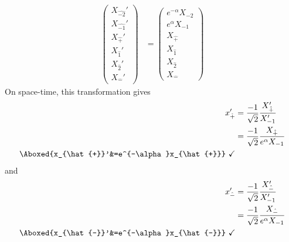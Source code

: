 \documentclass[]{article}
\numberwithin{equation}{section}
\begin{document}
{{\begin{align}
    \begin{pmatrix}
    {X}_{\hat{-2}}'\\
    {X}_{\hat{-1}}'\\
    {X}_{\hat{+}}'\\
    {X}_{\hat{1}}'\\
    {X}_{\hat{2}}'\\
    {X}_{\hat{-}}'
    \end{pmatrix}&= \begin{pmatrix}
    e^{-\alpha}{X}_{-2}\\
    e^{\alpha}{X}_{-1}\\
    {X}_{\hat{+}}\\
    {X}_{\hat{1}}\\
    {X}_{\hat{2}}\\
    {X}_{\hat{-}}
    \end{pmatrix}
\end{align}
On space-time, this transformation gives
\begin{align}
    x_{\hat{+}}'&=\frac{-1}{\sqrt{2}}\frac{{X}_{{\hat{+}}}'}{ {X}_{-1}'}\\
    &=\frac{-1}{\sqrt{2}}\frac{{X}_{{\hat{+}}}}{ e^{\alpha}{X}_{-1}}\\
    \Aboxed{x_{\hat{+}}'&=e^{-\alpha}x_{\hat{+}}}~\checkmark
\end{align}
and
\begin{align}
    x_{\hat{-}}'&=\frac{-1}{\sqrt{2}}\frac{{X}_{\hat{-}}'}{ {X}_{-1}'}\\
    &=\frac{-1}{\sqrt{2}}\frac{{X}_{\hat{-}}}{ e^{\alpha}{X}_{-1}}\\
    \Aboxed{x_{\hat{-}}'&=e^{-\alpha}x_{\hat{-}}}~\checkmark
\end{align}

}}
\end{document}
